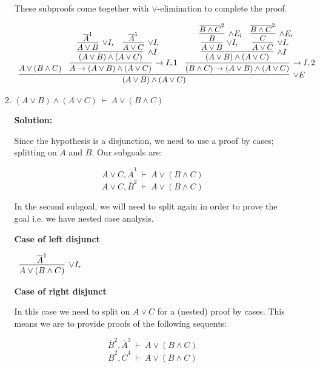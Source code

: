 \documentclass[11pt]{report}
\newcommand{\temp}[2]{{\overline{#2}}^{#1}}
\begin{document}
\begin{enumerate}
\begin{enumerate}
		These subproofs come together with $\lor$-elimination to complete the proof.

		\begin{scriptsize}
			\begin{center}
				$\begin{array}{c}
					\infer[\lor E]{(A \lor B) \land (A \lor C)}
						{A \lor (B \land C)
						&
						\infer[\to I, 1]{A \to (A \lor B) \land (A \lor C)}
							{\infer[\land I]{(A \lor B) \land (A \lor C)}
								{\infer[\lor I_{r}]{A \lor B}{\temp{1}{A}}
								&
								\infer[\lor I_{r}]{A \lor C}{\temp{1}{A}}}}
						&
						\infer[\to I, 2]{(B \land C) \to (A \lor B) \land (A \lor C)}
							{\infer[\land I]{(A \lor B) \land (A \lor C)}
								{\infer[\lor I_{r}]{A \lor B}
									{\infer[\land E_{l}]{B}{\temp{2}{B \land C}}}
								&
								\infer[\lor I_{r}]{A \lor C}
									{\infer[\land E_{r}]{C}{\temp{2}{B \land C}}}}}}
				\end{array}$
			\end{center}
		\end{scriptsize}
		
		\newpage
		\item $(A \lor B) \land (A \lor C) \ \vdash \ A \lor (B \land C)$
		
		\textbf{Solution:}

		Since the hypothesis is a disjunction, we need to use a proof by cases; splitting on $A$ and $B$. Our subgoals are: 

		$$A \lor C, \temp{1}{A} \ \vdash \ A \lor (B \land C) $$
		$$A \lor C, \temp{2}{B} \ \vdash \ A \lor (B \land C) $$

		In the second subgoal, we will need to split again in order to prove the goal i.e. we have nested case analysis. 

		\textbf{Case of left disjunct}

		\begin{center}
			$\begin{array}{c}
				\infer[\lor I_{r}]{A \lor (B \land C)}
					{\temp{1}{A}}
			\end{array}$
		\end{center}

		\textbf{Case of right disjunct}

		In this case we need to split on $A \lor C$ for a (nested) proof by cases. This means we are to provide proofs of the following sequents: 

		$$\temp{2}{B}, \temp{3}{A} \ \vdash \ A \lor (B \land C) $$
		$$\temp{2}{B}, \temp{4}{C} \ \vdash \ A \lor (B \land C) $$


\end{enumerate}
\end{enumerate}
\end{document}
